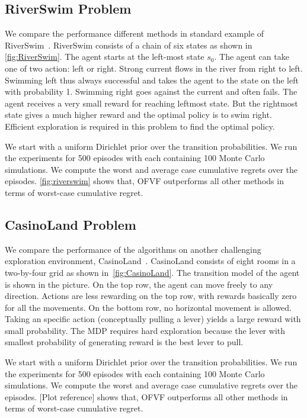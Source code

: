 \documentclass{article}
\theoremstyle{plain}
\theoremstyle{definition}
\begin{document}
\subsection{RiverSwim Problem}


We compare the performance different methods in standard example of RiverSwim~\citep{Osband2013, Strehl2004}. RiverSwim consists of a chain of six states as shown in \cref{fig:RiverSwim}. The agent starts at the left-most state $s_0$. The agent can take one of two action: left or right. Strong current flows in the river from right to left. Swimming left thus always successful and takes the agent to the state on the left with probability 1. Swimming right goes against the current and often fails. The agent receives a very small reward for reaching leftmost state. But the rightmost state gives a much higher reward and the optimal policy is to swim right. Efficient exploration is required in this problem to find the optimal policy.

We start with a uniform Dirichlet prior over the transition probabilities. We run the experiments for 500 episodes with each containing 100 Monte Carlo simulations. We compute the worst and average case cumulative regrets over the episodes. \cref{fig:riverswim} shows that, OFVF outperforms all other methods in terms of worst-case cumulative regret.

\subsection{CasinoLand Problem}
We compare the performance of the algorithms on another challenging exploration environment, CasinoLand~\citep{Strehl2004}. CasinoLand consists of eight rooms in a two-by-four grid as shown in~\cref{fig:CasinoLand}. The transition model of the agent is shown in the picture. On the top row, the agent can move freely to any direction. Actions are less rewarding on the top row, with rewards basically zero for all the movements. On the bottom row, no horizontal movement is allowed. Taking an specific action (conceptually pulling a lever) yields a large reward with small probability. The MDP requires hard exploration because the lever with smallest probability of generating reward is the best lever to pull.

We start with a uniform Dirichlet prior over the transition probabilities. We run the experiments for 500 episodes with each containing 100 Monte Carlo simulations. We compute the worst and average case cumulative regrets over the episodes. [Plot reference] shows that, OFVF outperforms all other methods in terms of worst-case cumulative regret.
\end{document}
